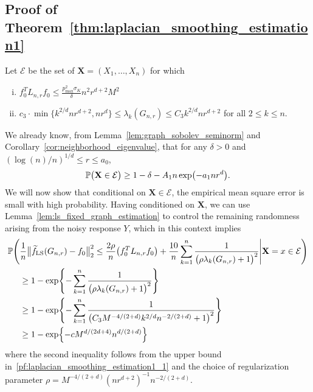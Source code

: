 \documentclass{article}
\newcommand{\1}{\mathbf{1}}
\newcommand{\Lap}{L}
\newcommand{\mc}[1]{\mathcal{#1}}
\newcommand{\Pbb}{\mathbb{P}}
\newcommand{\wt}[1]{\widetilde{#1}}
\newcommand{\LS}{\mathrm{LS}}
\theoremstyle{alden}
\theoremstyle{aldenthm}
\theoremstyle{definition}
\theoremstyle{remark}
\begin{document}
\subsection{Proof of Theorem~\ref{thm:laplacian_smoothing_estimation1}}
\label{subsec:laplacian_smoothing_estimation1_pf}
Let $\mc{E}$ be the set of $\mathbf{X} = (X_1,\ldots,X_n)$ for which
\begin{enumerate}[(i)]
	\item
	\label{pf:laplacian_smoothing_estimation1_0}
	$f_0^T \Lap_{n,r} f_0 \leq \frac{p_{\max}^2 \sigma_K}{\delta} n^2 r^{d + 2}M^2$
	\item 
	\label{pf:laplacian_smoothing_estimation1_1}
	$c_3 \cdot \min\{k^{2/d}nr^{d+2},nr^d\} \leq \lambda_k(G_{n,r}) \leq C_3k^{2/d}nr^{d + 2} $ for all $2 \leq k \leq n$.
\end{enumerate}
We already know, from Lemma~\ref{lem:graph_sobolev_seminorm} and Corollary~\ref{cor:neighborhood_eigenvalue}, that for any $\delta > 0$ and $(\log(n)/n)^{1/d} \leq r \leq a_0$,
\begin{equation}
\label{pf:laplacian_smoothing_estimation1_1.5}
\Pbb\bigl({\bf X} \in \mc{E}\bigr) \geq 1 - \delta - A_1n\exp\bigl(-a_1nr^d\bigr).
\end{equation}
We will now show that conditional on $\mathbf{X} \in \mc{E}$, the empirical mean square error is small with high probability. Having conditioned on $\mathbf{X}$, we can use Lemma~\ref{lem:ls_fixed_graph_estimation} to control the remaining randomness arising from the noisy response $Y$, which in this context implies
\begin{equation}
\label{pf:laplacian_smoothing_estimation1_2}
\begin{aligned}
\Pbb\Biggl(& \frac{1}{n}\bigl\|\wt{f}_{\LS}(G_{n,r}) - f_0\bigr\|_2^2 \leq \frac{2\rho}{n} \bigl(f_0^T \Lap_{n,r} f_0\bigr) + \frac{10}{n}\sum_{k = 1}^{n} \frac{1}{\bigl(\rho \lambda_{k}(G_{n,r}) + 1\bigr)^2} \Bigg| \mathbf{X} = x \in \mc{E}\Biggr) \\
& \geq 1 - \exp\Biggl\{-\sum_{k = 1}^{n}\frac{1}{\bigl(\rho \lambda_k(G_{n,r}) + 1\bigr)^2}\Biggr\} \\
& \geq 1 - \exp\Biggl\{-\sum_{k = 1}^{n}\frac{1}{\bigl(C_3M^{-4/(2+d)}k^{2/d}n^{-2/(2+d)} + 1\bigr)^2}\Biggr\} \\
& \geq 1 - \exp\Bigl\{-c M^{d/(2d + 4)} n^{d/(2+d)}\Bigr\}
\end{aligned}
\end{equation}
where the second inequality follows from the upper bound in~\ref{pf:laplacian_smoothing_estimation1_1} and the choice of regularization parameter $\rho = M^{-4/(2+d)}(nr^{d+2})^{-1}n^{-2/(2+d)}$. 
\end{document}
